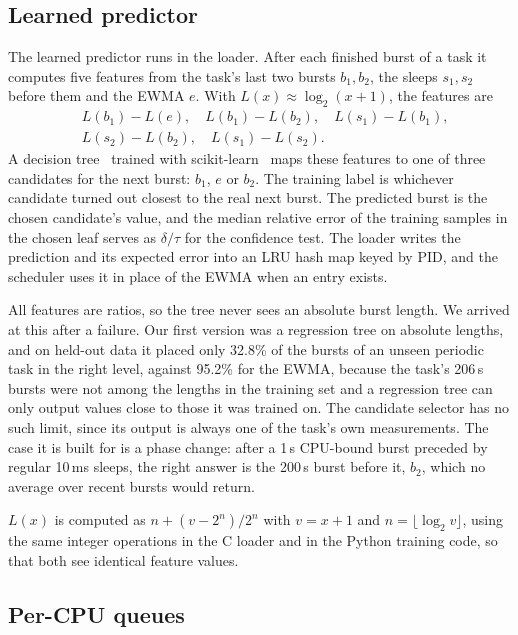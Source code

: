 \documentclass[conference]{IEEEtran}
\newcommand{\us}{\,\textmu{}s}
\newcommand{\ms}{\,ms}
\begin{document}
\subsection{Learned predictor}\label{sec:learned}

The learned predictor runs in the loader. After each finished burst of a task it computes five
features from the task's last two bursts $b_1, b_2$, the sleeps $s_1, s_2$ before them and the
EWMA $e$. With $L(x) \approx \log_2(x+1)$, the features are
\begin{equation}
\begin{aligned}
&L(b_1)-L(e),\quad L(b_1)-L(b_2),\quad L(s_1)-L(b_1),\\
&L(s_2)-L(b_2),\quad L(s_1)-L(s_2).
\end{aligned}
\end{equation}
A decision tree~\cite{cart} trained with scikit-learn~\cite{sklearn} maps these features to one of
three candidates for the next burst: $b_1$, $e$ or $b_2$. The training label is whichever
candidate turned out closest to the real next burst. The predicted burst is the chosen
candidate's value, and the median relative error of the training samples in the chosen leaf
serves as $\delta/\tau$ for the confidence test. The loader writes the prediction and its expected
error into an LRU hash map keyed by PID, and the scheduler uses it in place of the EWMA when an
entry exists.

All features are ratios, so the tree never sees an absolute burst length. We arrived at this
after a failure. Our first version was a regression tree on absolute lengths, and on held-out data it
placed only 32.8\% of the bursts of an unseen periodic task in the right level, against 95.2\%
for the EWMA, because the task's 206\us{} bursts were not among the lengths in the training set
and a regression tree can only output values close to those it was trained on. The candidate
selector has no such limit, since its output is always one of the task's own measurements. The
case it is built for is a phase change: after a 1\,s CPU-bound burst preceded by regular
10\ms{} sleeps, the right answer is the 200\us{} burst before it, $b_2$, which no average over
recent bursts would return.

$L(x)$ is computed as $n + (v - 2^n)/2^n$ with $v = x+1$ and $n = \lfloor\log_2 v\rfloor$, using
the same integer operations in the C loader and in the Python training code, so that both see
identical feature values.

\subsection{Per-CPU queues}
\end{document}
